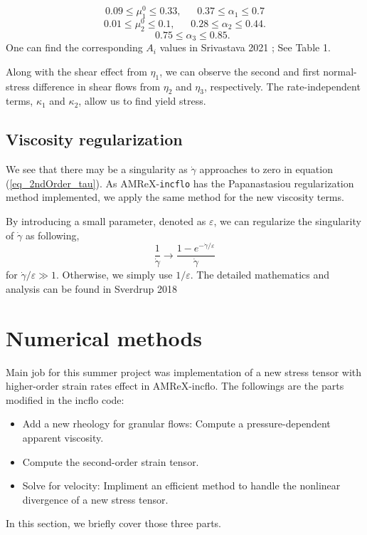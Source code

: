     \[
    0.09 \leq \mu_1^0 \leq 0.33, 
    \ \ \ \ \ \ \ 
    0.37 \leq \alpha_1 \leq 0.7
    \]
        \[
    0.01 \leq \mu_2^0 \leq 0.1, 
    \ \ \ \ \ \ \ 
    0.28 \leq \alpha_2 \leq 0.44.
    \]
            \[
    \ \ \ \ \ \ \ 
    0.75 \leq \alpha_3 \leq 0.85.
    \]
     One can find the corresponding $A_i$ values in Srivastava 2021 \cite{srivastava_viscometric_2021}; See Table 1.
\par
Along with the shear effect from $\eta_1$, we can observe the second and first normal-stress difference in shear flows from $\eta_2$ and $\eta_3$, respectively. The rate-independent terms, $\kappa_1$ and $\kappa_2$, allow us to find yield stress. 

\subsection{Viscosity regularization}
We see that there may be a singularity as $\dot{\gamma}$ approaches to zero in equation (\ref{eq_2ndOrder_tau}). 
As AMReX-\verb+incflo+ has the Papanastasiou regularization method implemented, we apply the same method for the new viscosity terms.
\par
By introducing a small parameter, denoted as $\varepsilon$, we can regularize the singularity of $\dot{\gamma}$ as following,
\[
  \frac{1}{\dot{\gamma}} \rightarrow \frac{1-e^{-\dot{\gamma} / \varepsilon}}{\dot{\gamma}}  
\]
for $\dot{\gamma}/\varepsilon \gg 1$. Otherwise, we simply use $1/\varepsilon$. 
The detailed mathematics and analysis can be found in Sverdrup 2018 \cite{sverdrup_highly_2018}
\section{Numerical methods}
Main job for this summer project was implementation of a new stress tensor with higher-order strain rates effect in AMReX-incflo. The followings are the parts modified in the incflo code: 
\begin{itemize}
	\item Add a new rheology for granular flows: Compute a pressure-dependent apparent viscosity.
	\item Compute the second-order strain tensor.
	\item Solve for velocity: Impliment an efficient method to handle the nonlinear divergence of a new stress tensor.
\end{itemize}
In this section, we briefly cover those three parts.
